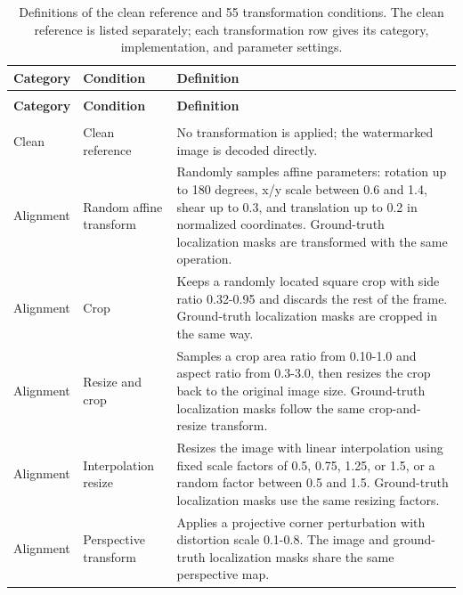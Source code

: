 
{\small
\setlength{\LTleft}{0pt}
\setlength{\LTright}{\fill}
\setlength{\LTcapwidth}{\textwidth}
\setlength{\tabcolsep}{2pt}
\renewcommand{\arraystretch}{1.08}
\begin{longtable}{@{}>{\raggedright\arraybackslash}p{} >{\raggedright\arraybackslash}p{} >{\raggedright\arraybackslash}p{}@{}}
\caption{Definitions of the clean reference and 55 transformation conditions. The clean reference is listed separately; each transformation row gives its category, implementation, and parameter settings.}
\label{tab:attack-implementation-summary}\\
\toprule
\textbf{Category} & \textbf{Condition} & \textbf{Definition} \\
\midrule
\endfirsthead
\multicolumn{3}{@{}l}{\footnotesize\textit{Table~\thetable\ continued.}}\\
\addlinespace[1pt]
\toprule
\textbf{Category} & \textbf{Condition} & \textbf{Definition} \\
\midrule
\endhead
\midrule
\multicolumn{3}{r}{Continued on next page}\\
\endfoot
\bottomrule
\endlastfoot
Clean & Clean reference & No transformation is applied; the watermarked image is decoded directly. \\
\addlinespace[2pt]
Alignment & Random affine transform & Randomly samples affine parameters: rotation up to 180 degrees, x/y scale between 0.6 and 1.4, shear up to 0.3, and translation up to 0.2 in normalized coordinates. Ground-truth localization masks are transformed with the same operation. \\
Alignment & Crop & Keeps a randomly located square crop with side ratio 0.32-0.95 and discards the rest of the frame. Ground-truth localization masks are cropped in the same way. \\
Alignment & Resize and crop & Samples a crop area ratio from 0.10-1.0 and aspect ratio from 0.3-3.0, then resizes the crop back to the original image size. Ground-truth localization masks follow the same crop-and-resize transform. \\
Alignment & Interpolation resize & Resizes the image with linear interpolation using fixed scale factors of 0.5, 0.75, 1.25, or 1.5, or a random factor between 0.5 and 1.5. Ground-truth localization masks use the same resizing factors. \\
Alignment & Perspective transform & Applies a projective corner perturbation with distortion scale 0.1-0.8. The image and ground-truth localization masks share the same perspective map. \\

\end{longtable}}
